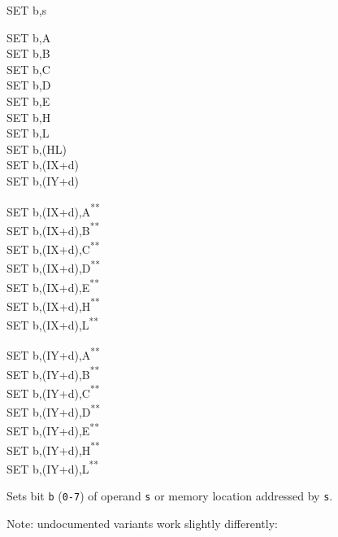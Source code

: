 \documentclass[12pt,twoside,openright,a4paper]{book}
\newcommand{\UNDOC}{\textnormal{\textsuperscript{**}}}
\begin{document}
\begin{basedescript}{
	\desclabelstyle{\multilinelabel}
	\desclabelwidth{3cm}}
\begin{DetailItem}{SET b,s}
		\begin{DetailVariants}
			SET b,A\\
			SET b,B\\
			SET b,C\\
			SET b,D\\
			SET b,E\\
			SET b,H\\
			SET b,L\\
			SET b,(HL)\\
			SET b,(IX+d)\\
			SET b,(IY+d)

			\columnbreak
			SET b,(IX+d),A\UNDOC\\
			SET b,(IX+d),B\UNDOC\\
			SET b,(IX+d),C\UNDOC\\
			SET b,(IX+d),D\UNDOC\\
			SET b,(IX+d),E\UNDOC\\
			SET b,(IX+d),H\UNDOC\\
			SET b,(IX+d),L\UNDOC

			\columnbreak
			SET b,(IY+d),A\UNDOC\\
			SET b,(IY+d),B\UNDOC\\
			SET b,(IY+d),C\UNDOC\\
			SET b,(IY+d),D\UNDOC\\
			SET b,(IY+d),E\UNDOC\\
			SET b,(IY+d),H\UNDOC\\
			SET b,(IY+d),L\UNDOC
		\end{DetailVariants}

		Sets bit {\tt b} ({\tt 0-7}) of operand {\tt s} or memory location addressed by {\tt s}.

		Note: undocumented variants work slightly differently:

		\begin{multicols}{2}

		\end{multicols}

		\DetailNoEffect
						
		\begin{DetailTiming}
		\end{DetailTiming}

	\end{DetailItem}


\end{basedescript}
\end{document}
